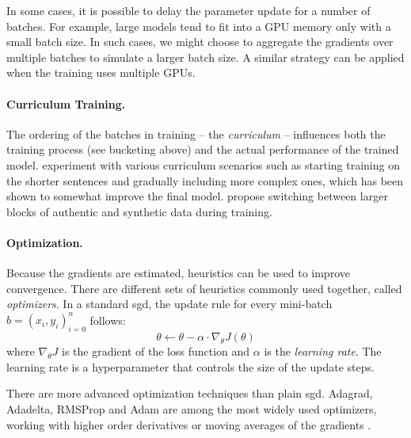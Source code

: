 In some cases, it is possible to delay the parameter update for a number of
batches. For example, large models tend to fit into a GPU memory only with a
small batch size. In such cases, we might choose to aggregate the gradients
over multiple batches to simulate a larger batch size. A similar strategy can
be applied when the training uses multiple GPUs.

\paragraph{Curriculum Training.} The ordering of the batches in training -- the
\emph{curriculum} -- influences both the training process (see bucketing above)
and the actual performance of the trained
model. \citet{kocmi-bojar-2017-curriculum} experiment with various curriculum
scenarios such as starting training on the shorter sentences and gradually
including more complex ones, which has been shown to somewhat improve the final
model. \citet{popel-etal-2020-transforming} propose switching between larger
blocks of authentic and synthetic data during training.

\paragraph{Optimization.}
Because the gradients are estimated, heuristics can be used to improve
convergence. There are different sets of heuristics commonly used together,
called \emph{optimizers}. In a standard \ac{sgd}, the update rule for every
mini-batch $b = (x_i, y_i)_{i=0}^{n}$ follows:
%
\begin{equation}
  \theta \gets \theta - \alpha  \cdot \nabla_{\theta}  J(\theta)
\end{equation}
%
where $\nabla_{\theta} J$ is the gradient of the loss function and $\alpha$ is
the \emph{learning rate}. The learning rate is a hyperparameter that controls
the size of the update steps.

There are more advanced optimization techniques than plain \ac{sgd}. Adagrad,
Adadelta, RMSProp and Adam are among the most widely used optimizers, working
with higher order derivatives or moving averages of the gradients
\citep{duchi2011adaptive,zeiler2012adadelta,tieleman2012lecture,kingma2014adam}.

